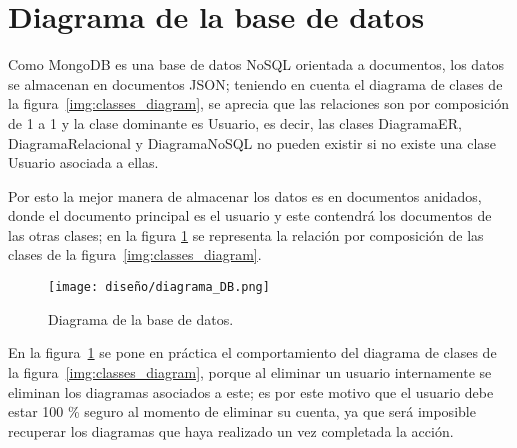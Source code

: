 \section{Diagrama de la base de datos}
Como MongoDB es una base de datos NoSQL orientada a documentos, los datos se almacenan en documentos JSON; teniendo en cuenta el diagrama de clases de la figura~\ref{img:classes_diagram}, se aprecia que las relaciones son por composición de 1 a 1 y la clase dominante es Usuario, es decir, las clases DiagramaER, DiagramaRelacional y DiagramaNoSQL no pueden existir si no existe una clase Usuario asociada a ellas.


Por esto la mejor manera de almacenar los datos es en documentos anidados, donde el documento principal es el usuario y este contendrá los documentos de las otras clases; en la figura \ref{img:database_schema} se representa la relación por composición de las clases de la figura~\ref{img:classes_diagram}.


\begin{figure}[H]
    \centering
    \texttt{[image: diseño/diagrama\_DB.png]}
    \caption{Diagrama de la base de datos.}
    \label{img:database_schema}
\end{figure}


En la figura~\ref{img:database_schema} se pone en práctica el comportamiento del diagrama de clases de la figura~\ref{img:classes_diagram}, porque al eliminar un usuario internamente se eliminan los diagramas asociados a este; es por este motivo que el usuario debe estar 100 \% seguro al momento de eliminar su cuenta, ya que será imposible recuperar los diagramas que haya realizado un vez completada la acción.